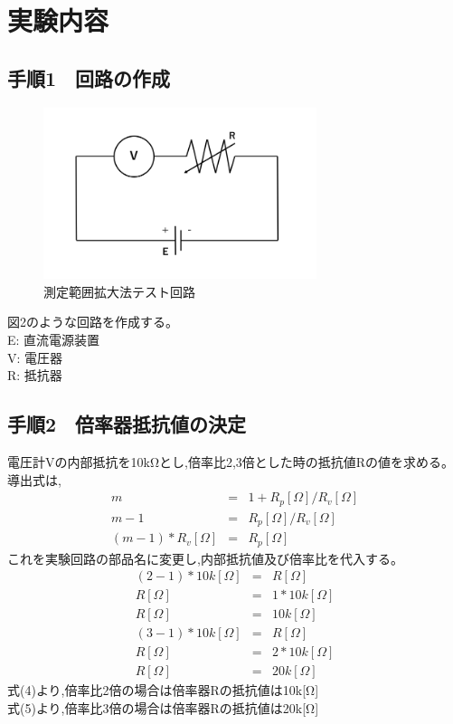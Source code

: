 \documentclass[titlepage]{jarticle}
\begin{document}
\section{実験内容}
\subsection{手順1　回路の作成}
\begin{figure}[H]
    \begin{center}
        \includegraphics[width=8cm]{image/image02.png}
        \caption{測定範囲拡大法テスト回路}
    \end{center}
\end{figure}
図2のような回路を作成する。\\
E: 直流電源装置\\
V: 電圧器\\
R: 抵抗器
\subsection{手順2　倍率器抵抗値の決定}
電圧計Vの内部抵抗を10kΩとし,倍率比2,3倍とした時の抵抗値Rの値を求める。導出式は,
\begin{eqnarray}
    m &=& 1+R_p[Ω]/R_v[Ω] \nonumber\\
    m-1 &=& R_p[Ω]/R_v[Ω] \nonumber\\
    (m-1)*R_v[Ω] &=& R_p[Ω] \nonumber
\end{eqnarray}
これを実験回路の部品名に変更し,内部抵抗値及び倍率比を代入する。
\begin{eqnarray}
    (2-1)*10k[Ω] &=& R[Ω] \nonumber\\
    R[Ω] &=& 1*10k[Ω] \nonumber\\
    R[Ω] &=& 10k[Ω]
\end{eqnarray}
\begin{eqnarray}
    (3-1)*10k[Ω] &=& R[Ω] \nonumber\\
    R[Ω] &=& 2*10k[Ω] \nonumber\\
    R[Ω] &=& 20k[Ω]
\end{eqnarray}
式(4)より,倍率比2倍の場合は倍率器Rの抵抗値は10k[Ω]\\
式(5)より,倍率比3倍の場合は倍率器Rの抵抗値は20k[Ω]
\end{document}
